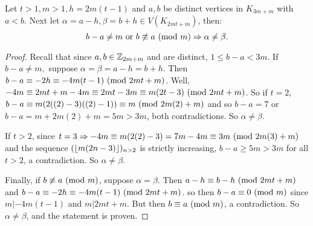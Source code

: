 \begin{thm}
    Let $t>1,m>1, h = 2m(t-1)$ and $a,b$ be distinct vertices in $K_{3m+m}$ with $a<b$. Next let $\alpha = a-h,\beta = b+h\in V(K_{2mt+m})$, then:
    $$b-a\neq m\text{ or }b\not\equiv a\ (\mathrm{mod}\ m)\Rightarrow \alpha\neq\beta.$$

    \begin{proof}
        Recall that since $a,b\in \mathbb{Z}_{2m+m}$ and are distinct, $1\leq b-a<3m$. If $b-a\neq m,$ suppose $\alpha = \beta = a-h=b+h$. Then $b-a\equiv -2h\equiv -4m(t-1)\ (\mathrm{mod}\ 2mt+m)$. Well,  $-4m \equiv 2mt+m-4m\equiv 2mt-3m\equiv m(2t-3)\ (\mathrm{mod}\ 2mt+m)$. So if $t=2$, $b-a\equiv m(2((2)-3)((2)-1))\equiv m\ (\mathrm{mod}\ 2m(2)+m)$ and so $b-a = 7$ or $b-a= m+2m(2)+m = 5m>3m$, both contradictions. So $\alpha\neq \beta$.
        
        If $t>2$, since $t=3\Rightarrow -4m\equiv m(2(2)-3) = 7m-4m\equiv 3m\ (\mathrm{mod}\ 2m(3)+m)$ and the sequence $(\lfloor m(2n-3)\rfloor)_{n>2}$ is strictly increasing, $b-a\geq 5m>3m$ for all $t>2$, a contradiction. So $\alpha\neq \beta$.

        Finally, if $b\not\equiv a\ (\mathrm{mod}\ m)$, suppose $\alpha = \beta$. Then $a-h\equiv b-h \ (\mathrm{mod}\ 2mt+m)$ and $b-a\equiv -2h\equiv -4m(t-1)\ (\mathrm{mod}\ 2mt+m)$. so then $b-a\equiv 0\ (\mathrm{mod}\ m)$ since $m|-4m(t-1)$ and $m|2mt+m.$ But then $b\equiv a\ (\mathrm{mod}\ m)$, a contradiction. So $\alpha\neq \beta$, and the statement is proven.
        
    \end{proof}
\end{thm}

